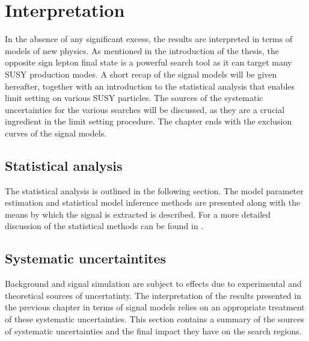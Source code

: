 \chapter{Interpretation}\label{sec:interpretation}
In the absence of any significant excess, the results are interpreted in terms of models of new physics. 
As mentioned in the introduction of the thesis, the opposite sign lepton final state is a powerful search tool as it can target many SUSY production modes. 
A short recap of the signal models will be given hereafter, together with an introduction to the statistical analysis that enables limit setting on various SUSY particles.
The sources of the systematic uncertainties for the various searches will be discussed, as they are a crucial ingredient in the limit setting procedure. 
The chapter ends with the exclusion curves of the signal models.

\section{Statistical analysis}
The statistical analysis is outlined in the following section. 
The model parameter estimation and statistical model inference methods are presented along with the means by which the signal is extracted is described. 
For a more detailed discussion of the statistical methods can be found in \cite{Lista:2016chp}. 
\section{Systematic uncertaintites}
Background and signal simulation are subject to effects due to experimental and theoretical sources of uncertatinty.
The interpretation of the results presented in the previous chapter in terms of signal models relies on an appropriate treatment of these systematic uncertainties. 
This section contains a summary of the sources of systematic uncertainties and the final impact they have on the search regions. 
